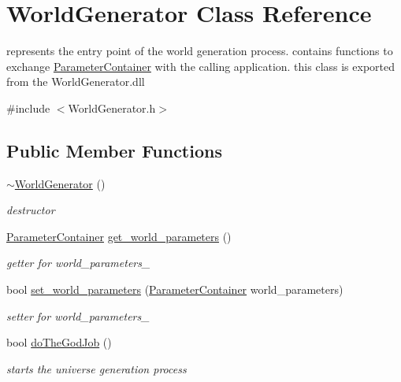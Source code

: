 \hypertarget{class_world_generator}{\section{World\-Generator Class Reference}
\label{class_world_generator}
}


represents the entry point of the world generation process. contains functions to exchange \hyperlink{struct_parameter_container}{Parameter\-Container} with the calling application. this class is exported from the World\-Generator.\-dll  




{\ttfamily \#include $<$World\-Generator.\-h$>$}

\subsection*{Public Member Functions}
\begin{DoxyCompactItemize}
\item 
\hypertarget{class_world_generator_afed7aa2e501ab283bb41bbaa6fbdf24a}{\hyperlink{class_world_generator_afed7aa2e501ab283bb41bbaa6fbdf24a}{$\sim$\-World\-Generator} ()}\label{class_world_generator_afed7aa2e501ab283bb41bbaa6fbdf24a}

\begin{DoxyCompactList}\small\item\em destructor \end{DoxyCompactList}\item 
\hyperlink{struct_parameter_container}{Parameter\-Container} \hyperlink{class_world_generator_ae6f6491b8dae06d237f23616479c755f}{get\-\_\-world\-\_\-parameters} ()
\begin{DoxyCompactList}\small\item\em getter for world\-\_\-parameters\-\_\- \end{DoxyCompactList}\item 
bool \hyperlink{class_world_generator_a5cd2d418569bf601b2d39fbb71c9f6eb}{set\-\_\-world\-\_\-parameters} (\hyperlink{struct_parameter_container}{Parameter\-Container} world\-\_\-parameters)
\begin{DoxyCompactList}\small\item\em setter for world\-\_\-parameters\-\_\- \end{DoxyCompactList}\item 
bool \hyperlink{class_world_generator_a6b5a256fd22a762b7e96b2d5e2b42be3}{do\-The\-God\-Job} ()
\begin{DoxyCompactList}\small\item\em starts the universe generation process \end{DoxyCompactList}\end{DoxyCompactItemize}

